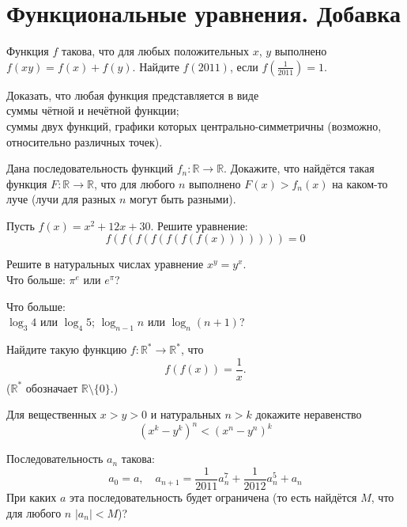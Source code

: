 
\section*{Функциональные уравнения. Добавка}

\begin{problems}





\item
Функция $f$ такова, что для любых положительных $x$, $y$ выполнено
$f(xy) = f(x) + f(y)$.
Найдите $f(2011)$, если $f\left(\frac{1}{2011}\right) = 1$.

\item
Доказать, что любая функция представляется в виде
\\\sp
суммы чётной и нечётной функции;
\\\sp
суммы двух функций, графики которых центрально-симметричны
(возможно, относительно различных точек).

\item
Дана последовательность функций $f_n \colon \mathbb{R} \to \mathbb{R}$.
Докажите, что найдётся такая функция
$F \colon \mathbb{R} \to \mathbb{R}$, что для любого $n$ выполнено $F(x) > f_n(x)$ на
каком-то луче
(лучи для разных $n$ могут быть разными).

\item
Пусть $f(x) = x^2 + 12x + 30$.
Решите уравнение:
\[
    f(f(f(f(f(f(f(x)))))))
=
    0
\]

\item
\sp
Решите в натуральных числах уравнение $x^y = y^x$.
\\\sp
Что больше: $\pi^e$ или $e^\pi$?

\item
Что больше:
\\
\sp
$\log_3 4$ или $\log_4 5$;
\quad\sp
$\log_{n - 1} n$ или $\log_n (n + 1)$?

\item
Найдите такую функцию $f \colon \mathbb{R}^* \to \mathbb{R}^*$, что 
\[
    f(f(x)) = \frac{1}{x}
.\]
($\mathbb{R}^*$ обозначает $\mathbb{R} \setminus \{0\}$.)

\item 
Для вещественных $x > y > 0$ и натуральных $n > k$ докажите неравенство
\[
    (x^k - y^k)^n < (x^n - y^n)^k
\]

\item
Последовательность $a_n$ такова: 
\[
    a_0 = a
,\quad
    a_{n+1}
=
    \frac{1}{2011} a_n^7 + \frac{1}{2012} a_n^5 + a_n
\]
При каких $a$ эта последовательность будет ограничена
(то есть найдётся $M$, что для любого $n$ $|a_n| < M$)?

\end{problems}

